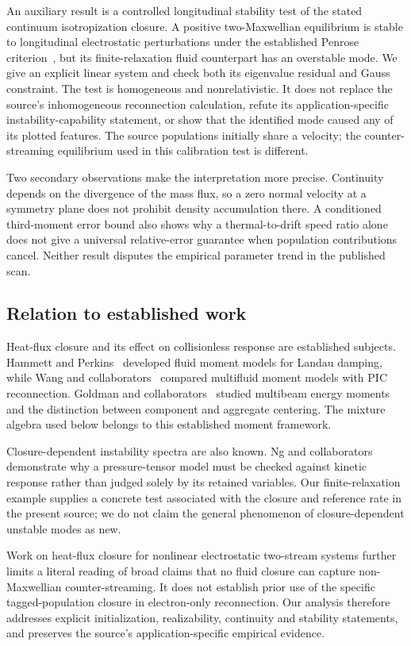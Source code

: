An auxiliary result is a controlled longitudinal stability test of the stated
continuum isotropization closure. A positive two-Maxwellian equilibrium is
stable to longitudinal electrostatic perturbations under the established
Penrose criterion~\cite{penrose1960}, but its
finite-relaxation fluid counterpart has an overstable mode. We give an explicit
linear system and check both its eigenvalue residual and Gauss constraint.
The test is homogeneous and nonrelativistic. It does not replace the source's
inhomogeneous reconnection calculation, refute its application-specific
instability-capability statement, or show that the identified mode caused any
of its plotted features. The source populations initially share a velocity;
the counter-streaming equilibrium used in this calibration test is different.

Two secondary observations make the interpretation more precise. Continuity depends
on the divergence of the mass flux, so a zero normal velocity at a symmetry
plane does not prohibit density accumulation there. A conditioned third-moment
error bound also shows why a thermal-to-drift speed ratio alone does not give
a universal relative-error guarantee when population contributions cancel.
Neither result disputes the empirical parameter trend in the published scan.

\subsection{Relation to established work}
Heat-flux closure and its effect on collisionless response are established
subjects. Hammett and Perkins~\cite{hammett1990} developed fluid moment models
for Landau damping, while Wang and collaborators~\cite{wang2015} compared
multifluid moment models with PIC reconnection. Goldman and
collaborators~\cite{goldman2020} studied multibeam energy moments and the
distinction between component and aggregate centering. The mixture algebra
used below belongs to this established moment framework.

Closure-dependent instability spectra are also known. Ng and
collaborators~\cite{ng2019} demonstrate why a pressure-tensor model must be
checked against kinetic response rather than judged solely by its retained
variables. Our finite-relaxation example supplies a concrete test associated
with the closure and reference rate in the present source; we do not claim the
general phenomenon of closure-dependent unstable modes as new.

Work on heat-flux closure for nonlinear electrostatic two-stream systems
\cite{ingelsten2025,ingelsten2026} further limits a literal reading of broad
claims that no fluid closure can capture non-Maxwellian counter-streaming.
It does not establish prior use of the specific tagged-population closure in
electron-only reconnection. Our analysis therefore addresses explicit
initialization, realizability, continuity and stability statements, and preserves the
source's application-specific empirical evidence.

